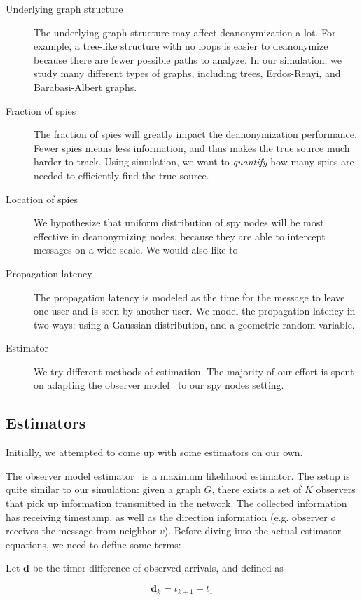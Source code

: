 \begin{description}
\item[Underlying graph structure] The underlying graph structure may affect deanonymization a lot. For example, a tree-like structure with no loops is easier to deanonymize because there are fewer possible paths to analyze. In our simulation, we study many different types of graphs, including trees, Erdos-Renyi, and Barabasi-Albert graphs.
\item[Fraction of spies] The fraction of spies will greatly impact the deanonymization performance. Fewer spies means less information, and thus makes the true source much harder to track. Using simulation, we want to \emph{quantify} how many spies are needed to efficiently find the true source.
\item[Location of spies] We hypothesize that uniform distribution of spy nodes will be most effective in deanonymizing nodes, because they are able to intercept messages on a wide scale. We would also like to 
\item[Propagation latency] The propagation latency is modeled as the time for the message to leave one user and is seen by another user. 
We model the propagation latency in two ways: using a Gaussian distribution, and a geometric random variable. 
\item[Estimator] We try different methods of estimation. The majority of our effort is spent on adapting the observer model~\cite{pinto} to our spy nodes setting.
\end{description}

\subsection{Estimators}
Initially, we attempted to come up with some estimators on our own. 

The observer model estimator~\cite{pinto} is a maximum likelihood estimator. The setup is quite similar to our simulation: given a graph $G$, there exists a set of $K$ observers that pick up information transmitted in the network. The collected information has receiving timestamp, as well as the direction information (e.g. observer $o$ receives the message from neighbor $v$). Before diving into the actual estimator equations, we need to define some terms:

Let $\boldsymbol{d}$ be the timer difference of observed arrivals, and defined as

\begin{equation}
\boldsymbol{d}_k = t_{k+1} - t_1
\end{equation}

